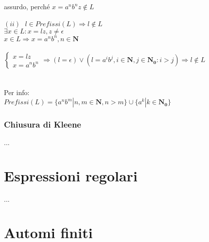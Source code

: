 \documentclass[]{article}
\begin{document}
assurdo, perché \mbox{$ x = a^nb^nz \not \in L $}
\\
\\
\mbox{$ (ii) \text{ } l \in Prefissi(L) \Rightarrow l \not \in L $}
\\
\mbox{$ \exists x \in L \colon x = lz, z \neq \epsilon $}
\\
\mbox{$ x \in L \Rightarrow x = a^nb^n, n \in \mathbf{N} $}
\\
\\
\begin{math}
\begin{cases}
x = lz \\
x = a^nb^n
\end{cases}
\Rightarrow
( l = \epsilon ) \lor ( l = a^ib^j, i \in \mathbf{N}, j \in \mathbf{N_0} \colon i > j )
\Rightarrow
l \not \in L
\end{math}
\\
\\
\\
Per info:
\\
\mbox{$ Prefissi(L) = \{ a^nb^m | n, m \in \mathbf{N}, n > m \} \cup \{ a^k | k \in \mathbf{N_0} \}  $}


\newpage


\subsubsection{Chiusura di Kleene}

...


\section{Espressioni regolari}

...



\section{Automi finiti}
\end{document}
